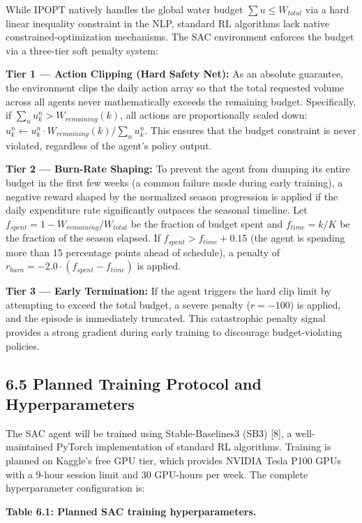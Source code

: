 While IPOPT natively handles the global water budget
\(\sum u \leq W_{total}\) via a hard linear inequality constraint in the
NLP, standard RL algorithms lack native constrained-optimization
mechanisms. The SAC environment enforces the budget via a three-tier
soft penalty system:

\textbf{Tier 1 --- Action Clipping (Hard Safety Net):} As an absolute
guarantee, the environment clips the daily action array so that the
total requested volume across all agents never mathematically exceeds
the remaining budget. Specifically, if
\(\sum_n u_k^n > W_{remaining}(k)\), all actions are proportionally
scaled down:
\(u_k^n \gets u_k^n \cdot W_{remaining}(k) / \sum_n u_k^n\). This
ensures that the budget constraint is never violated, regardless of the
agent's policy output.

\textbf{Tier 2 --- Burn-Rate Shaping:} To prevent the agent from dumping
its entire budget in the first few weeks (a common failure mode during
early training), a negative reward shaped by the normalized season
progression is applied if the daily expenditure rate significantly
outpaces the seasonal timeline. Let
\(f_{spent} = 1 - W_{remaining}/W_{total}\) be the fraction of budget
spent and \(f_{time} = k/K\) be the fraction of the season elapsed. If
\(f_{spent} > f_{time} + 0.15\) (the agent is spending more than 15
percentage points ahead of schedule), a penalty of
\(r_{burn} = -2.0 \cdot (f_{spent} - f_{time})\) is applied.

\textbf{Tier 3 --- Early Termination:} If the agent triggers the hard
clip limit by attempting to exceed the total budget, a severe penalty
(\(r = -100\)) is applied, and the episode is immediately truncated.
This catastrophic penalty signal provides a strong gradient during early
training to discourage budget-violating policies.

\subsection{6.5 Planned Training Protocol and
Hyperparameters}\label{planned-training-protocol-and-hyperparameters}

The SAC agent will be trained using Stable-Baselines3 (SB3) {[}8{]}, a
well-maintained PyTorch implementation of standard RL algorithms.
Training is planned on Kaggle's free GPU tier, which provides NVIDIA
Tesla P100 GPUs with a 9-hour session limit and 30 GPU-hours per week.
The complete hyperparameter configuration is:

\textbf{Table 6.1: Planned SAC training hyperparameters.}

